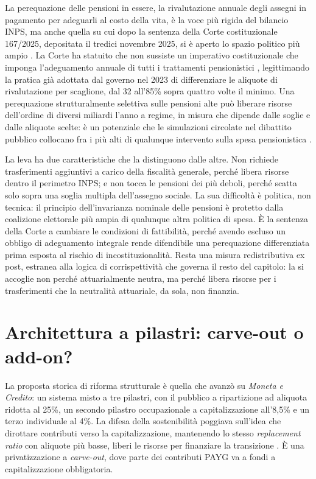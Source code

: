 \noindent
La perequazione delle pensioni in essere, la rivalutazione annuale degli assegni
in pagamento per adeguarli al costo della vita, è la voce più rigida del bilancio
INPS, ma anche quella su cui dopo la sentenza della Corte costituzionale 167/2025,
depositata il tredici novembre 2025, si è aperto lo spazio politico più ampio
\cite{CorteCost167_2025}. La Corte ha statuito che \guillemotleft{}non sussiste un
imperativo costituzionale che imponga l'adeguamento annuale di tutti i trattamenti
pensionistici \guillemotright{}, legittimando la pratica già adottata dal governo nel
2023 di differenziare le aliquote di rivalutazione per scaglione, dal 32 all'85\%
sopra quattro volte il minimo. Una perequazione strutturalmente selettiva sulle
pensioni alte può liberare risorse dell'ordine di diversi miliardi l'anno a regime,
in misura che dipende dalle soglie e dalle aliquote scelte: è un potenziale che le
simulazioni circolate nel dibattito pubblico collocano fra i più alti di qualunque
intervento sulla spesa pensionistica \cite{EconomiaItalia2026_video}.

\medskip
\noindent
La leva ha due caratteristiche che la distinguono dalle altre. Non richiede
trasferimenti aggiuntivi a carico della fiscalità generale, perché libera risorse
dentro il perimetro INPS; e non tocca le pensioni dei più deboli, perché scatta
solo sopra una soglia multipla dell'assegno sociale. La sua difficoltà è politica,
non tecnica: il principio dell'invarianza nominale delle pensioni è protetto dalla
coalizione elettorale più ampia di qualunque altra politica di spesa. È la sentenza
della Corte a cambiare le condizioni di fattibilità, perché avendo escluso un
obbligo di adeguamento integrale rende difendibile una perequazione differenziata
prima esposta al rischio di incostituzionalità. Resta una misura redistributiva ex
post, estranea alla logica di corrispettività che governa il resto del capitolo: la
si accoglie non perché attuarialmente neutra, ma perché libera risorse per i
trasferimenti che la neutralità attuariale, da sola, non finanzia.

\section{Architettura a pilastri: carve-out o add-on?}
\label{sec:carveout}

\noindent
La proposta storica di riforma strutturale è quella che \citet{Marchionne2004}
avanzò su \emph{Moneta e Credito}: un sistema misto a tre pilastri, con il pubblico
a ripartizione ad aliquota ridotta al 25\%, un secondo pilastro occupazionale a
capitalizzazione all'8,5\% e un terzo individuale al 4\%. La difesa della
sostenibilità poggiava sull'idea che dirottare contributi verso la
capitalizzazione, mantenendo lo stesso \emph{replacement ratio} con aliquote più
basse, liberi le risorse per finanziare la transizione \cite{Marchionne2004}. È una
privatizzazione a \emph{carve-out}, dove parte dei contributi PAYG va a fondi a
capitalizzazione obbligatoria.

